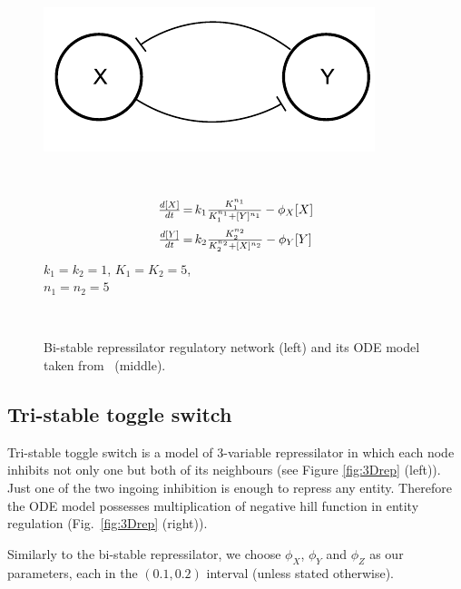 \begin{figure}
	\centering
	\begin{center}
		\vspace*{-6mm}
		\hspace*{-1cm}  
		\parbox{4cm}{\includegraphics[scale=.6]{2Drep.pdf}}~
		\parbox{6cm}{
			$$\begin{array}{c@{$\,=\,$}l}
			\frac{d[X]}{dt} & k_1 \frac{K_{1}^{n_1}}{K_{1}^{n_1}+[Y]^{n_1}} - \phi_{X}[X]\\[3mm]
			\frac{d[Y]}{dt} & k_2 \frac{K_{2}^{n_2}}{K_{2}^{n_2}+[X]^{n_2}} - \phi_{Y}[Y]
			\end{array}$$
			\center
			$k_1=k_2=1$, $K_{1}=K_{2}=5$, \\
			$n_1=n_2=5$
		}~~
		\vspace*{-5mm}
	\end{center}
	\caption{Bi-stable repressilator regulatory network (left) and its ODE model taken from~\cite{brim2015high} (middle).}
	\vspace*{-0.5em}
	\label{fig:2Drep}
\end{figure}

\subsection{Tri-stable toggle switch}

Tri-stable toggle switch is a model of 3-variable repressilator in which each node inhibits not only one but both of its neighbours (see Figure \ref{fig:3Drep} (left)). Just one of the two ingoing inhibition is enough to repress any entity. Therefore the ODE model possesses multiplication of negative hill function in entity regulation (Fig.~\ref{fig:3Drep} (right)).

Similarly to the bi-stable repressilator, we choose $\phi_X$, $\phi_Y$ and $\phi_Z$ as our parameters, each in the $(0.1, 0.2)$ interval (unless stated otherwise). 

